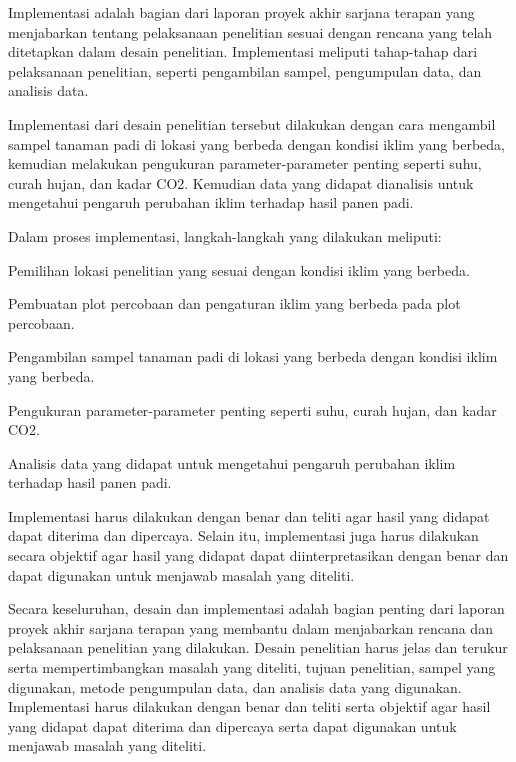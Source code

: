Implementasi adalah bagian dari laporan proyek akhir sarjana terapan yang menjabarkan tentang pelaksanaan penelitian sesuai dengan rencana yang telah ditetapkan dalam desain penelitian. Implementasi meliputi tahap-tahap dari pelaksanaan penelitian, seperti pengambilan sampel, pengumpulan data, dan analisis data.

Implementasi dari desain penelitian tersebut dilakukan dengan cara mengambil sampel tanaman padi di lokasi yang berbeda dengan kondisi iklim yang berbeda, kemudian melakukan pengukuran parameter-parameter penting seperti suhu, curah hujan, dan kadar CO2. Kemudian data yang didapat dianalisis untuk mengetahui pengaruh perubahan iklim terhadap hasil panen padi.

Dalam proses implementasi, langkah-langkah yang dilakukan meliputi:

\begin{packed_enum}
    \item Pemilihan lokasi penelitian yang sesuai dengan kondisi iklim yang berbeda.
    \item Pembuatan plot percobaan dan pengaturan iklim yang berbeda pada plot percobaan.
    \item Pengambilan sampel tanaman padi di lokasi yang berbeda dengan kondisi iklim yang berbeda.
    \item Pengukuran parameter-parameter penting seperti suhu, curah hujan, dan kadar CO2.
    \item Analisis data yang didapat untuk mengetahui pengaruh perubahan iklim terhadap hasil panen padi.
    \item Implementasi harus dilakukan dengan benar dan teliti agar hasil yang didapat dapat diterima dan dipercaya. Selain itu, implementasi juga harus dilakukan secara objektif agar hasil yang didapat dapat diinterpretasikan dengan benar dan dapat digunakan untuk menjawab masalah yang diteliti.
\end{packed_enum}

Secara keseluruhan, desain dan implementasi adalah bagian penting dari laporan proyek akhir sarjana terapan yang membantu dalam menjabarkan rencana dan pelaksanaan penelitian yang dilakukan. Desain penelitian harus jelas dan terukur serta mempertimbangkan masalah yang diteliti, tujuan penelitian, sampel yang digunakan, metode pengumpulan data, dan analisis data yang digunakan. Implementasi harus dilakukan dengan benar dan teliti serta objektif agar hasil yang didapat dapat diterima dan dipercaya serta dapat digunakan untuk menjawab masalah yang diteliti.

